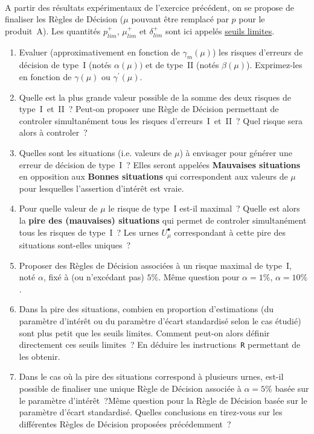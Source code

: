\documentclass[10pt]{report}
\begin{document}
\begin{exercice} $ $

A partir des résultats expérimentaux de l'exercice précédent, on se propose de finaliser les Règles de Décision ($\mu$ pouvant être remplacé par $p$ pour le produit~A). Les quantités $p^+_{lim}$, $\mu^+_{lim}$ et $\delta^+_{lim}$ sont ici appelés \underline{seuils limites}.
\begin{enumerate}
\item Evaluer (approximativement en fonction de $\gamma_m(\mu)$) les risques d'erreurs de décision de type~I (notés $\alpha(\mu))$ et de type~II (notés $\beta(\mu)$). Exprimez-les en fonction de $\gamma(\mu)$ ou $\gamma^\prime(\mu)$.
\item Quelle est la plus grande valeur possible de la somme des deux risques de type~I~et~II~?
Peut-on proposer une Règle de Décision permettant de controler simultanément tous les risques d'erreurs~I~et~II~? Quel risque sera alors à controler~?
\item Quelles sont les situations (i.e. valeurs de $\mu$) à envisager pour générer une erreur de décision de type~I~? Elles seront appelées \textbf{Mauvaises situations} en opposition aux \textbf{Bonnes situations} qui correspondent aux valeurs de $\mu$ pour lesquelles l'assertion d'intérêt est vraie.
\item Pour quelle valeur de $\mu$ le risque de type~I est-il maximal~? 
Quelle est alors la \textbf{pire des (mauvaises) situations} qui permet de controler simultanément tous les risques de type~I~? Les urnes $U^\bullet_\mu$ correspondant à cette pire des situations sont-elles uniques~? 
\item Proposer des Règles de Décision associées à un risque maximal de type~I, noté $\alpha$, fixé à (ou n'excédant pas) $5\%$. Même question pour $\alpha=1\%$, $\alpha=10\%$.
\item Dans la pire des situations, combien en proportion d'estimations (du paramètre d'intérêt ou du paramètre d'écart standardisé selon le cas étudié) sont plus petit que les seuils limites.    
Comment peut-on alors définir directement ces seuils limites~? En déduire les instructions~\texttt{R} permettant de les obtenir.   
\item Dans le cas où la pire des situations correspond à plusieurs urnes, est-il possible de finaliser une unique Règle de Décision associée à $\alpha=5\%$ basée sur le paramètre d'intérêt~?Même question pour la Règle de Décision basée sur le paramètre d'écart standardisé. Quelles conclusions en tirez-vous sur les différentes Règles de Décision proposées précédemment~?    
\end{enumerate}

\end{exercice}
\end{document}
